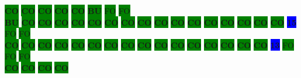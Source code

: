 \colorbox{green}{\color[rgb]{0,0,0}\textbf{CO}}%
\colorbox{green}{\color[rgb]{0,0,0}\textbf{CO}}%
\colorbox{green}{\color[rgb]{0,0,0}\textbf{CO}}%
\colorbox{green}{\color[rgb]{0,0,0}\textbf{CO}}%
\colorbox{green}{\color[rgb]{0,0,0}\textbf{CO}}%
\colorbox{green}{\color[rgb]{1,0,0}\textbf{BU}}%
\colorbox{green}{\color[gray]{0.75}FO}%
\colorbox{green}{\color[gray]{0.75}FO}%
\\
\colorbox{green}{\color[rgb]{1,0,0}\textbf{BU}}%
\colorbox{green}{\color[rgb]{0,0,0}\textbf{CO}}%
\colorbox{green}{\color[rgb]{0,0,0}\textbf{CO}}%
\colorbox{green}{\color[rgb]{0,0,0}\textbf{CO}}%
\colorbox{green}{\color[rgb]{0,0,0}\textbf{CO}}%
\colorbox{green}{\color[rgb]{0,0,0}\textbf{CO}}%
\colorbox{green}{\color[rgb]{0,0,0}\textbf{CO}}%
\colorbox{green}{\color[rgb]{0,0,0}\textbf{CO}}%
\colorbox{green}{\color[rgb]{0,0,0}\textbf{CO}}%
\colorbox{green}{\color[rgb]{0,0,0}\textbf{CO}}%
\colorbox{green}{\color[rgb]{0,0,0}\textbf{CO}}%
\colorbox{green}{\color[rgb]{0,0,0}\textbf{CO}}%
\colorbox{green}{\color[rgb]{0,0,0}\textbf{CO}}%
\colorbox{green}{\color[rgb]{0,0,0}\textbf{CO}}%
\colorbox{green}{\color[rgb]{0,0,0}\textbf{CO}}%
\colorbox{green}{\color[rgb]{0,0,0}\textbf{CO}}%
\colorbox{green}{\color[rgb]{0,0,0}\textbf{CO}}%
\colorbox{blue}{\color[rgb]{1,0,0}\textbf{15}}%
\colorbox{green}{\color[gray]{0.75}FO}%
\colorbox{green}{\color[gray]{0.75}FO}%
\\
\colorbox{green}{\color[rgb]{0,0,0}\textbf{CO}}%
\colorbox{green}{\color[rgb]{0,0,0}\textbf{CO}}%
\colorbox{green}{\color[rgb]{0,0,0}\textbf{CO}}%
\colorbox{green}{\color[rgb]{0,0,0}\textbf{CO}}%
\colorbox{green}{\color[rgb]{0,0,0}\textbf{CO}}%
\colorbox{green}{\color[rgb]{0,0,0}\textbf{CO}}%
\colorbox{green}{\color[rgb]{0,0,0}\textbf{CO}}%
\colorbox{green}{\color[rgb]{0,0,0}\textbf{CO}}%
\colorbox{green}{\color[rgb]{0,0,0}\textbf{CO}}%
\colorbox{green}{\color[rgb]{0,0,0}\textbf{CO}}%
\colorbox{green}{\color[rgb]{0,0,0}\textbf{CO}}%
\colorbox{green}{\color[rgb]{0,0,0}\textbf{CO}}%
\colorbox{green}{\color[rgb]{0,0,0}\textbf{CO}}%
\colorbox{green}{\color[rgb]{0,0,0}\textbf{CO}}%
\colorbox{green}{\color[rgb]{0,0,0}\textbf{CO}}%
\colorbox{green}{\color[rgb]{0,0,0}\textbf{CO}}%
\colorbox{blue}{\color[rgb]{1,0,0}\textbf{13}}%
\colorbox{green}{\color[gray]{0.75}FO}%
\colorbox{green}{\color[gray]{0.75}FO}%
\colorbox{green}{\color[gray]{0.75}FO}%
\\
\colorbox{green}{\color[rgb]{0,0,0}\textbf{CO}}%
\colorbox{green}{\color[rgb]{0,0,0}\textbf{CO}}%
\colorbox{green}{\color[rgb]{0,0,0}\textbf{CO}}%
\colorbox{green}{\color[rgb]{0,0,0}\textbf{CO}}%
